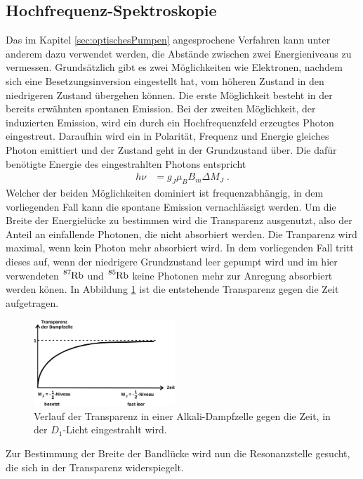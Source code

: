 \subsection{Hochfrequenz-Spektroskopie}
Das im Kapitel \ref{sec:optischesPumpen} angesprochene Verfahren kann unter anderem dazu verwendet werden, die Abstände zwischen zwei Energieniveaus zu vermessen.
Grundsätzlich gibt es zwei Möglichkeiten wie Elektronen, nachdem sich eine Besetzungsinversion eingestellt hat, vom höheren Zustand in den niedrigeren Zustand übergehen können.
Die erste Möglichkeit besteht in der bereits erwähnten spontanen Emission.
Bei der zweiten Möglichkeit, der induzierten Emission, wird ein durch ein Hochfrequenzfeld erzeugtes Photon eingestreut.
Daraufhin wird ein in Polarität, Frequenz und Energie gleiches Photon emittiert und der Zustand geht in der Grundzustand über.
Die dafür benötigte Energie des eingestrahlten Photons entspricht
\begin{align}
	h\nu&=g_J\mu_BB_m\Delta M_J\;.
	\label{eq:hnu}
\end{align}
Welcher der beiden Möglichkeiten dominiert ist frequenzabhängig, in dem vorliegenden Fall kann die spontane Emission vernachlässigt werden.
Um die Breite der Energielücke zu bestimmen wird die Transparenz ausgenutzt, also der Anteil an einfallende Photonen, die nicht absorbiert werden.
Die Tranparenz wird maximal, wenn kein Photon mehr absorbiert wird.
In dem vorliegenden Fall tritt dieses auf, wenn der niedrigere Grundzustand leer gepumpt wird und im hier verwendeten  $\ce{^{87}_{}Rb}$ und $\ce{^{85}_{}Rb}$ keine Photonen mehr zur Anregung absorbiert werden könen.
In Abbildung \ref{fig:TransparenzZeit} ist die entstehende Transparenz gegen die Zeit aufgetragen.
\begin{figure}
	\centering
	\includegraphics[width=0.475\textwidth]{img/TransparenzZeit.png}
	\caption{Verlauf der Transparenz in einer Alkali-Dampfzelle gegen die Zeit, in der $D_1$-Licht eingestrahlt wird.}
	\label{fig:TransparenzZeit}
\end{figure}
Zur Bestimmung der Breite der Bandlücke wird nun die Resonanzstelle gesucht, die sich in der Transparenz widerspiegelt.
